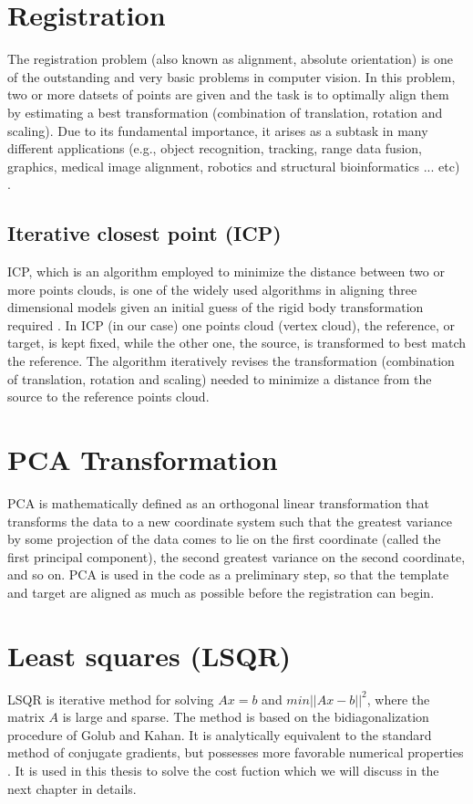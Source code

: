 \documentclass[../structure.tex]{subfiles}
\begin{document}
\section{Registration}
	The registration problem (also known as alignment, absolute orientation) is one of the outstanding and very basic problems in computer vision. In this problem, two or more datsets of points are given and the task is to optimally align them by estimating a best transformation (combination of translation, rotation and scaling). Due to its fundamental importance, it arises as a subtask in many different applications (e.g., object recognition, tracking, range data fusion, graphics, medical image alignment, robotics and structural bioinformatics ... etc) \cite{Li2007}.
		\subsection{Iterative closest point (ICP)}
		 ICP, which is an algorithm employed to minimize the distance between two or more points clouds, is one of the widely used algorithms in aligning three dimensional models given an initial guess of the rigid body transformation required \cite{Zhang1994}.
		 In ICP (in our case) one points cloud (vertex cloud), the reference, or target, is kept fixed, while the other one, the source, is transformed to best match the reference. The algorithm iteratively revises the transformation (combination of translation, rotation and scaling) needed to minimize a distance from the source to the reference points cloud.
\section{PCA Transformation}
PCA is mathematically defined as an orthogonal linear transformation that transforms the data to a new coordinate system such that the greatest variance by some projection of the data comes to lie on the first coordinate (called the first principal component), the second greatest variance on the second coordinate, and so on\cite{Jolliffe2002}.
PCA is used in the code as a preliminary step, so that the template and target are aligned as much as possible before the registration can begin.
\section{Least squares (LSQR)}
LSQR is iterative method for solving $Ax=b$ and $min||Ax-b||^2$, where the matrix $A$ is large and sparse. The method is based on the bidiagonalization procedure of Golub and Kahan. It is analytically equivalent to the standard method of conjugate gradients, but possesses more favorable numerical properties \cite{Paige1982a}. It is used in this thesis to solve the cost fuction which we will discuss in the next chapter in details.
\end{document}
